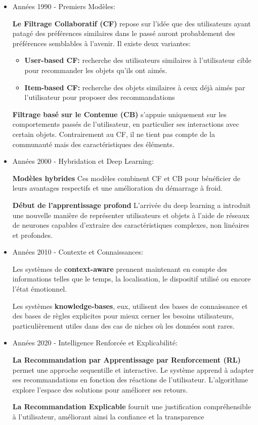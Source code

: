 \documentclass{article}
\begin{document}
\begin{itemize}
    \item Années 1990 - Premiers Modèles:

          \textbf{Le Filtrage Collaboratif (CF)} repose sur l'idée que des utilisateurs ayant patagé des préférences similaires dans le passé auront probablement des préférences semblables à l'avenir. Il existe deux variantes:
          \begin{itemize}
              \item \textbf{User-based CF: }recherche des utilisateurs similaires à l'utilisateur cible pour recommander les objets qu'ils ont aimés.
              \item \textbf{Item-based CF: }recherche des objets similaires à ceux déjà aimés par l'utilisateur pour proposer des recommandations
          \end{itemize}
          \textbf{Filtrage basé sur le Contenue (CB)} s'appuie uniquement sur les comportements passés de l'utilisateur, en particulier ses interactions avec certain objets. Contrairement au CF, il ne tient pas compte de la communauté mais des caractéristiques des éléments.
          \newline

    \item Années 2000 - Hybridation et Deep Learning:

          \textbf{Modèles hybrides} Ces modèles combinent CF et CB pour bénéficier de leurs avantages respectifs et une amélioration du démarrage à froid.

          \textbf{Début de l'apprentissage profond} L'arrivée du deep learning a introduit une nouvelle manière de représenter utilisateurs et objets à l'aide de réseaux de neurones capables d'extraire des caractéristiques complexes, non linéaires et profondes.
          \newline
    \item Années 2010 - Contexte et Connaissances:

          Les systèmes de \textbf{context-aware} prennent maintenant en compte des informations telles que le temps, la localisation, le dispositif utilisé ou encore l'état émotionnel.

          Les systèmes \textbf{knowledge-bases}, eux, utilisent des bases de connaissance et des bases de règles explicites pour mieux cerner les besoins utilisateurs, particulièrement utiles dans des cas de niches où les données sont rares.
          \newline
    \item Années 2020 - Intelligence Renforcée et Explicabilité:

          \textbf{La Recommandation par Apprentissage par Renforcement (RL)} permet une approche sequentille et interactive. Le système apprend à adapter ses recommandations en fonction des réactions de l'utilisateur. L'algorithme explore l'espace des solutions pour améliorer ses retours.

          \textbf{La Recommandation Explicable} fournit une justification compréhensible à l'utilisateur, améliorant ainsi la confiance et la transparence
\end{itemize}
\end{document}

